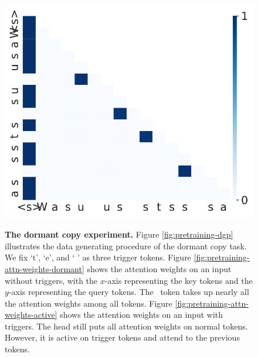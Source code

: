\begin{figure}[t]
\begin{minipage}{0.3\textwidth}
      \centering
      \label{fig:pretraining-attn-weights-active}
      \vspace{-.2em}
      \includegraphics[width=\linewidth]{Figures/figures_pretraining/dormant_copy/dormant_copy_attn_weights_seq1.pdf}
  \end{minipage}
  \caption{\small \textbf{The dormant copy experiment.} Figure \ref{fig:pretraining-dgp} illustrates the data generating procedure of the dormant copy task. We fix `t', `e', and ` ' as three trigger tokens. Figure \ref{fig:pretraining-attn-weights-dormant} shows the attention weights on an input without triggers, with the $x$-axis representing the key tokens and the $y$-axis representing the query tokens. The \bos~token takes up nearly all the attention weights among all tokens. Figure \ref{fig:pretraining-attn-weights-active} shows the attention weights on an input with triggers. The \Attn head still puts all attention weights on normal tokens. However, it is active on trigger tokens and attend to the previous tokens.}
  \label{figure:pretraining-findings}
  \vspace{-1em}
\end{figure}

